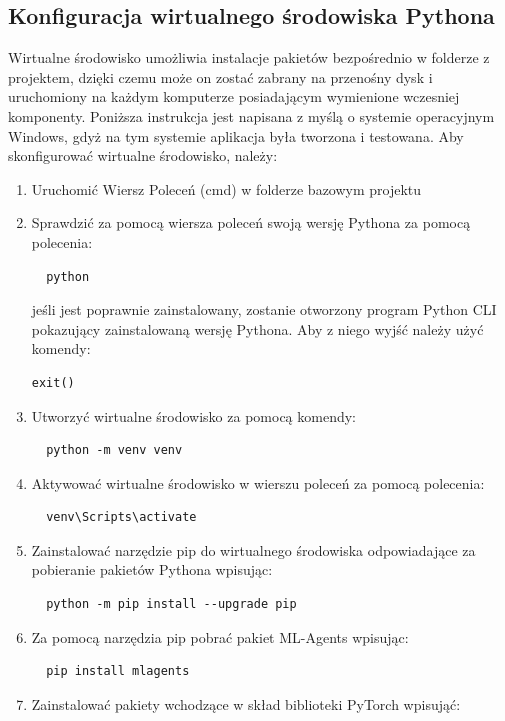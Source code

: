 \documentclass{SGGW-thesis}
\begin{document}
\subsection{Konfiguracja wirtualnego środowiska Pythona}
Wirtualne środowisko umożliwia instalacje pakietów bezpośrednio w folderze z projektem, dzięki czemu może on zostać zabrany na przenośny dysk i uruchomiony na każdym komputerze posiadającym wymienione wczesniej komponenty.
Poniższa instrukcja jest napisana z myślą o systemie operacyjnym Windows, gdyż na tym systemie aplikacja była tworzona i testowana.
Aby skonfigurować wirtualne środowisko, należy:
\begin{enumerate}
  \item{Uruchomić Wiersz Poleceń (cmd) w folderze bazowym projektu}
  \item{Sprawdzić za pomocą wiersza poleceń swoją wersję Pythona za pomocą polecenia:
  \begin{lstlisting}
  python
  \end{lstlisting}
  jeśli jest poprawnie zainstalowany, zostanie otworzony program Python CLI pokazujący zainstalowaną wersję Pythona. Aby z niego wyjść należy użyć komendy:
  \begin{lstlisting}[language=Python]
  exit()
  \end{lstlisting}
  }
  \item{Utworzyć wirtualne środowisko za pomocą komendy:
  \begin{lstlisting}
  python -m venv venv
  \end{lstlisting}
  }
  \item{Aktywować wirtualne środowisko w wierszu poleceń za pomocą polecenia:
  \begin{lstlisting}
  venv\Scripts\activate
  \end{lstlisting}
  }
  \item{Zainstalować narzędzie pip do wirtualnego środowiska odpowiadające za pobieranie pakietów Pythona wpisując:
  \begin{lstlisting}
  python -m pip install --upgrade pip
  \end{lstlisting}
  }
  \item{Za pomocą narzędzia pip pobrać pakiet ML-Agents wpisując:
  \begin{lstlisting}
  pip install mlagents
  \end{lstlisting}
  }
  \item{Zainstalować pakiety wchodzące w skład biblioteki PyTorch wpisująć:
  \begin{lstlisting}

\end{lstlisting}}
\end{enumerate}
\end{document}

